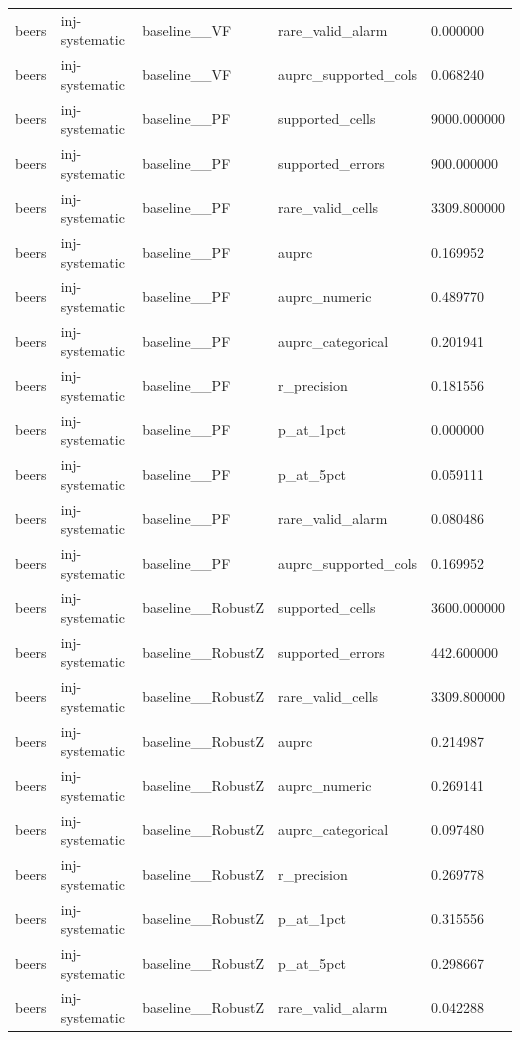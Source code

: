 \begin{tabular}{lllll}
beers & inj-systematic & baseline\_\_VF & rare\_valid\_alarm & 0.000000 \\
beers & inj-systematic & baseline\_\_VF & auprc\_supported\_cols & 0.068240 \\
beers & inj-systematic & baseline\_\_PF & supported\_cells & 9000.000000 \\
beers & inj-systematic & baseline\_\_PF & supported\_errors & 900.000000 \\
beers & inj-systematic & baseline\_\_PF & rare\_valid\_cells & 3309.800000 \\
beers & inj-systematic & baseline\_\_PF & auprc & 0.169952 \\
beers & inj-systematic & baseline\_\_PF & auprc\_numeric & 0.489770 \\
beers & inj-systematic & baseline\_\_PF & auprc\_categorical & 0.201941 \\
beers & inj-systematic & baseline\_\_PF & r\_precision & 0.181556 \\
beers & inj-systematic & baseline\_\_PF & p\_at\_1pct & 0.000000 \\
beers & inj-systematic & baseline\_\_PF & p\_at\_5pct & 0.059111 \\
beers & inj-systematic & baseline\_\_PF & rare\_valid\_alarm & 0.080486 \\
beers & inj-systematic & baseline\_\_PF & auprc\_supported\_cols & 0.169952 \\
beers & inj-systematic & baseline\_\_RobustZ & supported\_cells & 3600.000000 \\
beers & inj-systematic & baseline\_\_RobustZ & supported\_errors & 442.600000 \\
beers & inj-systematic & baseline\_\_RobustZ & rare\_valid\_cells & 3309.800000 \\
beers & inj-systematic & baseline\_\_RobustZ & auprc & 0.214987 \\
beers & inj-systematic & baseline\_\_RobustZ & auprc\_numeric & 0.269141 \\
beers & inj-systematic & baseline\_\_RobustZ & auprc\_categorical & 0.097480 \\
beers & inj-systematic & baseline\_\_RobustZ & r\_precision & 0.269778 \\
beers & inj-systematic & baseline\_\_RobustZ & p\_at\_1pct & 0.315556 \\
beers & inj-systematic & baseline\_\_RobustZ & p\_at\_5pct & 0.298667 \\
beers & inj-systematic & baseline\_\_RobustZ & rare\_valid\_alarm & 0.042288 \\

\end{tabular}
